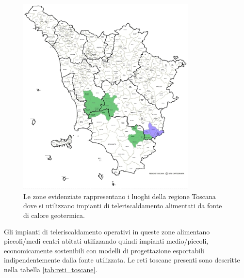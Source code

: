 \documentclass[laurea,oneside,11pt]{USiena_tesiLM}
\begin{document}
\begin{figure}[!ht]
\centering
\includegraphics[width=0.8\textwidth]{figure/toscana}
\caption{Le zone evidenziate rappresentano i luoghi della regione Toscana dove si utilizzano impianti di teleriscaldamento alimentati da fonte di calore geotermica.}
\label{fig:toscana}
\end{figure}

Gli impianti di teleriscaldamento operativi in queste zone alimentano  piccoli/medi centri abitati utilizzando quindi impianti medio/piccoli, economicamente sostenibili con modelli di progettazione esportabili indipendentemente dalla fonte utilizzata. Le reti toscane presenti sono descritte nella tabella \ref{tab:reti_toscane}.
\end{document}
